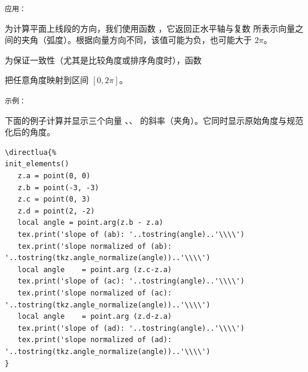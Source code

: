 \medskip
\texttt{应用：}

为计算平面上线段的方向，我们使用函数 ，它返回正水平轴与复数  所表示向量之间的夹角（弧度）。根据向量方向不同，该值可能为负，也可能大于 $2\pi$。

\medskip
为保证一致性（尤其是比较角度或排序角度时），函数

 把任意角度映射到区间 $[0, 2\pi]$。

\medskip
\texttt{示例：}

下面的例子计算并显示三个向量 、、 的斜率（夹角）。它同时显示原始角度与规范化后的角度。
\begin{Verbatim}
\directlua{%
init_elements()
   z.a = point(0, 0)
   z.b = point(-3, -3)
   z.c = point(0, 3)
   z.d = point(2, -2)
   local angle = point.arg(z.b - z.a)
   tex.print('slope of (ab): '..tostring(angle)..'\\\\')
   tex.print('slope normalized of (ab): '..tostring(tkz.angle_normalize(angle))..'\\\\')
   local angle    = point.arg (z.c-z.a)
   tex.print('slope of (ac): '..tostring(angle)..'\\\\')
   tex.print('slope normalized of (ac): '..tostring(tkz.angle_normalize(angle))..'\\\\')
   local angle    = point.arg (z.d-z.a)
   tex.print('slope of (ad): '..tostring(angle)..'\\\\')
   tex.print('slope normalized of (ad): '..tostring(tkz.angle_normalize(angle))..'\\\\')
}
\end{Verbatim}

